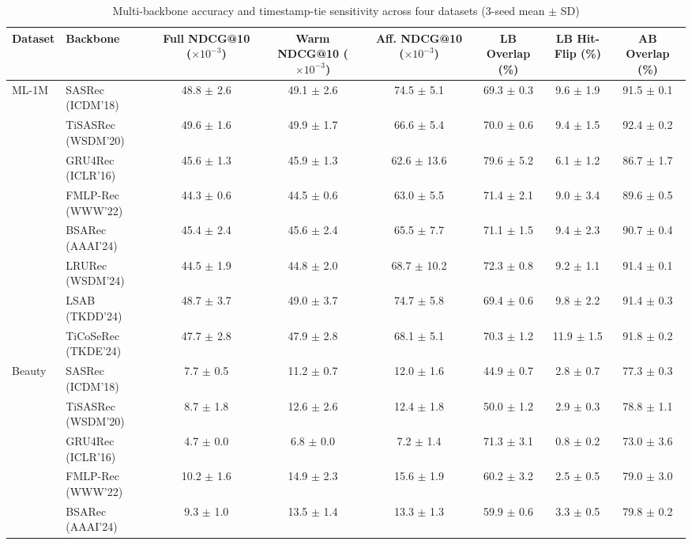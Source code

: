 \begin{table}[!htbp]
\centering
\caption{Multi-backbone accuracy and timestamp-tie sensitivity across four datasets (3-seed mean $\pm$ SD)}
\label{tab:multi-backbone}
\fontsize{8}{10}\selectfont
\begin{tabular}{llcccccc}
\toprule
Dataset & Backbone & Full NDCG@10 ($\times10^{-3}$) & Warm NDCG@10 ($\times10^{-3}$) & Aff. NDCG@10 ($\times10^{-3}$) & LB Overlap (\%) & LB Hit-Flip (\%) & AB Overlap (\%) \\
\midrule
ML-1M & SASRec (ICDM'18) & 48.8 $\pm$ 2.6 & 49.1 $\pm$ 2.6 & 74.5 $\pm$ 5.1 & 69.3 $\pm$ 0.3 & 9.6 $\pm$ 1.9 & 91.5 $\pm$ 0.1 \\
 & TiSASRec (WSDM'20) & 49.6 $\pm$ 1.6 & 49.9 $\pm$ 1.7 & 66.6 $\pm$ 5.4 & 70.0 $\pm$ 0.6 & 9.4 $\pm$ 1.5 & 92.4 $\pm$ 0.2 \\
 & GRU4Rec (ICLR'16) & 45.6 $\pm$ 1.3 & 45.9 $\pm$ 1.3 & 62.6 $\pm$ 13.6 & 79.6 $\pm$ 5.2 & 6.1 $\pm$ 1.2 & 86.7 $\pm$ 1.7 \\
 & FMLP-Rec (WWW'22) & 44.3 $\pm$ 0.6 & 44.5 $\pm$ 0.6 & 63.0 $\pm$ 5.5 & 71.4 $\pm$ 2.1 & 9.0 $\pm$ 3.4 & 89.6 $\pm$ 0.5 \\
 & BSARec (AAAI'24) & 45.4 $\pm$ 2.4 & 45.6 $\pm$ 2.4 & 65.5 $\pm$ 7.7 & 71.1 $\pm$ 1.5 & 9.4 $\pm$ 2.3 & 90.7 $\pm$ 0.4 \\
 & LRURec (WSDM'24) & 44.5 $\pm$ 1.9 & 44.8 $\pm$ 2.0 & 68.7 $\pm$ 10.2 & 72.3 $\pm$ 0.8 & 9.2 $\pm$ 1.1 & 91.4 $\pm$ 0.1 \\
 & LSAB (TKDD'24) & 48.7 $\pm$ 3.7 & 49.0 $\pm$ 3.7 & 74.7 $\pm$ 5.8 & 69.4 $\pm$ 0.6 & 9.8 $\pm$ 2.2 & 91.4 $\pm$ 0.3 \\
 & TiCoSeRec (TKDE'24) & 47.7 $\pm$ 2.8 & 47.9 $\pm$ 2.8 & 68.1 $\pm$ 5.1 & 70.3 $\pm$ 1.2 & 11.9 $\pm$ 1.5 & 91.8 $\pm$ 0.2 \\
\midrule
Beauty & SASRec (ICDM'18) & 7.7 $\pm$ 0.5 & 11.2 $\pm$ 0.7 & 12.0 $\pm$ 1.6 & 44.9 $\pm$ 0.7 & 2.8 $\pm$ 0.7 & 77.3 $\pm$ 0.3 \\
 & TiSASRec (WSDM'20) & 8.7 $\pm$ 1.8 & 12.6 $\pm$ 2.6 & 12.4 $\pm$ 1.8 & 50.0 $\pm$ 1.2 & 2.9 $\pm$ 0.3 & 78.8 $\pm$ 1.1 \\
 & GRU4Rec (ICLR'16) & 4.7 $\pm$ 0.0 & 6.8 $\pm$ 0.0 & 7.2 $\pm$ 1.4 & 71.3 $\pm$ 3.1 & 0.8 $\pm$ 0.2 & 73.0 $\pm$ 3.6 \\
 & FMLP-Rec (WWW'22) & 10.2 $\pm$ 1.6 & 14.9 $\pm$ 2.3 & 15.6 $\pm$ 1.9 & 60.2 $\pm$ 3.2 & 2.5 $\pm$ 0.5 & 79.0 $\pm$ 3.0 \\
 & BSARec (AAAI'24) & 9.3 $\pm$ 1.0 & 13.5 $\pm$ 1.4 & 13.3 $\pm$ 1.3 & 59.9 $\pm$ 0.6 & 3.3 $\pm$ 0.5 & 79.8 $\pm$ 0.2 \\

\end{tabular}
\end{table}
